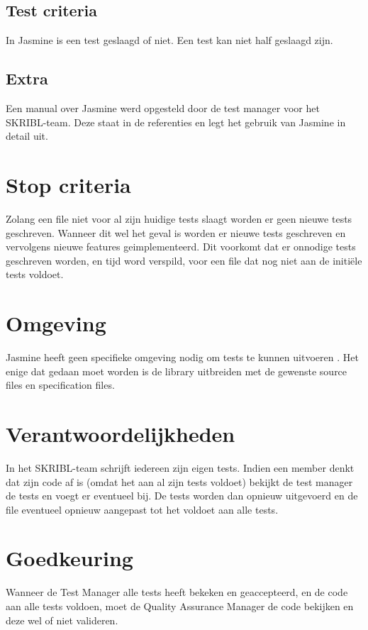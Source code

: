 \documentclass{article}
\begin{document}
\subsection{Test criteria}
In Jasmine is een test geslaagd of niet. Een test kan niet half geslaagd zijn.

\subsection{Extra}
Een manual over Jasmine werd opgesteld door de test manager voor het SKRIBL-team. Deze staat in de referenties en legt het gebruik van Jasmine in detail uit. 

\section{Stop criteria}
Zolang een file niet voor al zijn huidige tests slaagt worden er geen nieuwe tests geschreven. Wanneer dit wel het geval is worden er nieuwe tests geschreven en vervolgens nieuwe features geimplementeerd. Dit voorkomt dat er onnodige tests geschreven worden, en tijd word verspild, voor een file dat nog niet aan de initi{\"e}le tests voldoet.

\section{Omgeving}
Jasmine heeft geen specifieke omgeving nodig om tests te kunnen uitvoeren . Het enige dat gedaan moet worden is de library uitbreiden met de gewenste source files en specification files.

\section{Verantwoordelijkheden}
In het SKRIBL-team schrijft iedereen zijn eigen tests. Indien een member denkt dat zijn code af is (omdat het aan al zijn tests voldoet) bekijkt de test manager de tests en voegt er eventueel bij. De tests worden dan opnieuw uitgevoerd en de file eventueel opnieuw aangepast tot het voldoet aan alle tests. 

\section{Goedkeuring}
Wanneer de Test Manager alle tests heeft bekeken en geaccepteerd, en de code aan alle tests voldoen, moet de Quality Assurance Manager de code bekijken en deze wel of niet valideren. 


\clearpage
\end{document}
